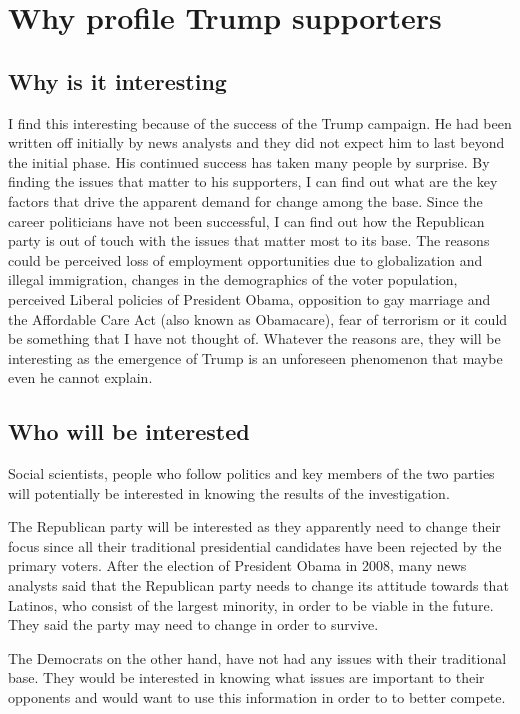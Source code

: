 \documentclass{sig-alternate-05-2015}
\begin{document}
\section{Why profile Trump supporters}

\subsection{Why is it interesting}
I find this interesting because of the success of the Trump campaign. He had been written off initially by news analysts and they did not expect him to last beyond the initial phase. His continued success has taken many people by surprise. By finding the issues that matter to his supporters, I can find out what are the key factors that drive the apparent demand for change among the base. Since the career politicians have not been successful, I can find out how the Republican party is out of touch with the issues that matter most to its base. The reasons could be perceived loss of employment opportunities due to globalization and illegal immigration, changes in the demographics of the voter population, perceived Liberal policies of President Obama, opposition to gay marriage and the Affordable Care Act (also known as Obamacare), fear of terrorism or it could be something that I have not thought of. Whatever the reasons are, they will be interesting as the emergence of Trump is an unforeseen phenomenon that maybe even he cannot explain.

\subsection{Who will be interested}
Social scientists, people who follow politics and key members of the two parties will potentially be interested in knowing the results of the investigation. 

The Republican party will be interested as they apparently need to change their focus since all their traditional presidential candidates have been rejected by the primary voters. After the election of President Obama in 2008, many news analysts said that the Republican party needs to change its attitude towards that Latinos, who consist of the largest minority, in order to be viable in the future. They said the party may need to change in order to survive.  

The Democrats on the other hand, have not had any issues with their traditional base. They would be interested in knowing what issues are important to their opponents and would want to use this information in order to to better compete.
\end{document}
